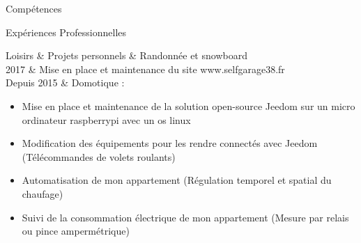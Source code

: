 

\begin{rubriquetableau}[\firstcolumnwidth]{Compétences}
	
	
\end{rubriquetableau}

\begin{rubriquetableau}[\firstcolumnwidth]{Expériences Professionnelles}
    
    
    \newpage
    
    
    
    
    
    
    
\end{rubriquetableau}


\newpage
\begin{rubriquetableau}[\firstcolumnwidth]{Loisirs \& Projets personnels}
			& Randonnée et snowboard \\
2017        & Mise en place et maintenance du site www.selfgarage38.fr \\
Depuis 2015 & Domotique :
			\begin{itemize}
				\item Mise en place et maintenance de la solution open-source Jeedom sur un micro ordinateur raspberrypi avec un os linux
				\item Modification des équipements pour les rendre connectés avec Jeedom (Télécommandes de volets roulants)
				\item Automatisation de mon appartement (Régulation temporel et spatial du chaufage)
				\item Suivi de la consommation électrique de mon appartement (Mesure par relais ou pince ampermétrique)
			\end{itemize}
\end{rubriquetableau}
